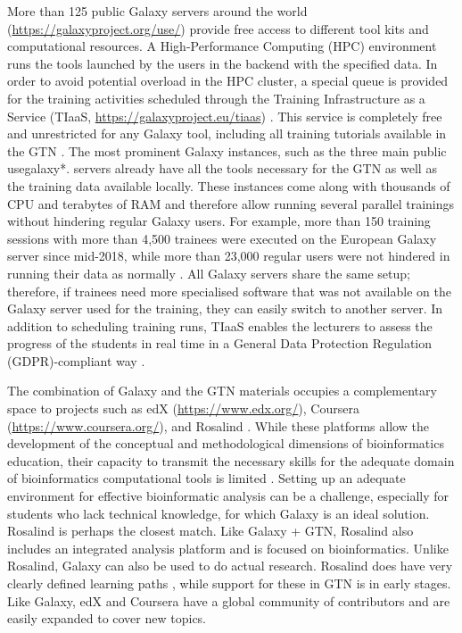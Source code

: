 More than 125 public Galaxy servers around the world (\url{https://galaxyproject.org/use/}) provide free access to different tool kits and computational resources. A High-Performance Computing (HPC) environment runs the tools launched by the users in the backend with the specified data. In order to avoid potential overload in the HPC cluster, a special queue is provided for the training activities scheduled through the Training Infrastructure as a Service (TIaaS, \url{https://galaxyproject.eu/tiaas}) \cite{rasche2020training}. This service is completely free and unrestricted for any Galaxy tool, including all training tutorials available in the GTN \cite{Batut_2018}. The most prominent Galaxy instances, such as the three main public usegalaxy*. servers already have all the tools necessary for the GTN as well as the training data available locally. These instances come along with thousands of CPU and terabytes of RAM and therefore allow running several parallel trainings without hindering regular Galaxy users. For example, more than 150 training sessions with more than 4,500 trainees were executed on the European Galaxy server since mid-2018, while more than 23,000 regular users were not hindered in running their data as normally \cite{rasche2020training}. All Galaxy servers share the same setup; therefore, if trainees need more specialised software that was not available on the Galaxy server used for the training, they can easily switch to another server. In addition to scheduling training runs, TIaaS enables the lecturers to assess the progress of the students in real time in a General Data Protection Regulation (GDPR)-compliant way \cite{rasche2020training}.

The combination of Galaxy and the GTN materials occupies a complementary space to projects such as edX (\url{https://www.edx.org/}), Coursera (\url{https://www.coursera.org/}), and Rosalind \cite{Searls_2012}. While these platforms allow the development of the conceptual and methodological dimensions of bioinformatics education, their capacity to transmit the necessary skills for the adequate domain of bioinformatics computational tools is limited \cite{Magana_2014}. Setting up an adequate environment for effective bioinformatic analysis can be a challenge, especially for students who lack technical knowledge, for which Galaxy is an ideal solution. Rosalind is perhaps the closest match. Like Galaxy + GTN, Rosalind also includes an integrated analysis platform and is focused on bioinformatics. Unlike Rosalind, Galaxy can also be used to do actual research. Rosalind does have very clearly defined learning paths \cite{Searls_2012}, while support for these in GTN is in early stages. Like Galaxy, edX and Coursera have a global community of contributors and are easily expanded to cover new topics.

